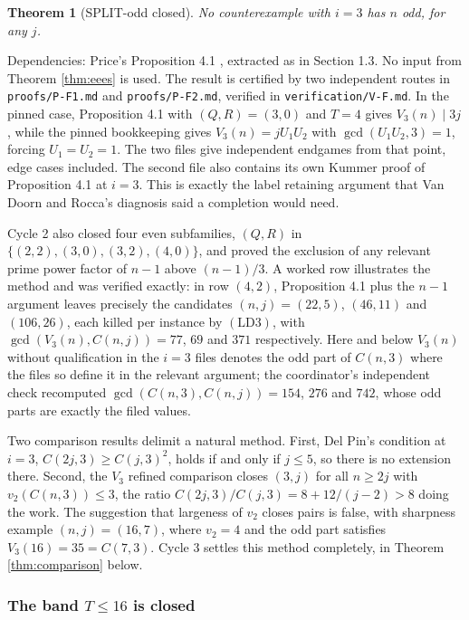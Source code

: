 \documentclass[11pt]{article}
\newtheorem{theorem}{Theorem}[section]
\theoremstyle{remark}
\newcommand{\Vthree}{V_3(n)}
\newcommand{\LDthree}{\ensuremath{\mathrm{(LD3)}}}
\begin{document}
\begin{theorem}[SPLIT-odd closed]
\label{thm:splitodd}
No counterexample with $i=3$ has $n$ odd, for any $j$.
\end{theorem}

Dependencies: Price's Proposition 4.1 \cite{Price}, extracted as in Section 1.3. No input from Theorem \ref{thm:eees} is used. The result is certified by two independent routes in \texttt{proofs/P-F1.md} and \texttt{proofs/P-F2.md}, verified in \texttt{verification/V-F.md}. In the pinned case, Proposition 4.1 with $(Q,R)=(3,0)$ and $T=4$ gives $V_3(n)\mid 3j$, while the pinned bookkeeping gives $V_3(n)=jU_1U_2$ with $\gcd(U_1U_2,3)=1$, forcing $U_1=U_2=1$. The two files give independent endgames from that point, edge cases included. The second file also contains its own Kummer proof of Proposition 4.1 at $i=3$. This is exactly the label retaining argument that Van Doorn and Rocca's diagnosis said a completion would need.

Cycle 2 also closed four even subfamilies, $(Q,R)$ in $\{(2,2),(3,0),(3,2),(4,0)\}$, and proved the exclusion of any relevant prime power factor of $n-1$ above $(n-1)/3$. A worked row illustrates the method and was verified exactly: in row $(4,2)$, Proposition 4.1 plus the $n-1$ argument leaves precisely the candidates $(n,j)=(22,5)$, $(46,11)$ and $(106,26)$, each killed per instance by \LDthree{}, with $\gcd(\Vthree,C(n,j))=77$, $69$ and $371$ respectively. Here and below $\Vthree$ without qualification in the $i=3$ files denotes the odd part of $C(n,3)$ where the files so define it in the relevant argument; the coordinator's independent check recomputed $\gcd(C(n,3),C(n,j))=154$, $276$ and $742$, whose odd parts are exactly the filed values.

Two comparison results delimit a natural method. First, Del Pin's condition at $i=3$, $C(2j,3)\ge C(j,3)^2$, holds if and only if $j\le 5$, so there is no extension there. Second, the $V_3$ refined comparison closes $(3,j)$ for all $n\ge 2j$ with $v_2(C(n,3))\le 3$, the ratio $C(2j,3)/C(j,3)=8+12/(j-2)>8$ doing the work. The suggestion that largeness of $v_2$ closes pairs is false, with sharpness example $(n,j)=(16,7)$, where $v_2=4$ and the odd part satisfies $V_3(16)=35=C(7,3)$. Cycle 3 settles this method completely, in Theorem \ref{thm:comparison} below.

\subsubsection{The band $T\le 16$ is closed}
\end{document}
